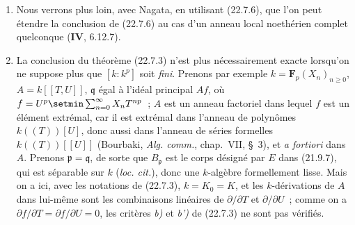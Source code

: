\begin{remarks}[22.7.7]
\label{0.22.7.7-fr}
\begin{enumerate}
  \item[(i)] Nous verrons plus loin, avec Nagata, en utilisant (22.7.6), que
  l'on peut étendre la conclusion de (22.7.6) au cas d'un anneau local
  noethérien complet quelconque (\textbf{IV}, 6.12.7).

  \item[(ii)] La conclusion du théorème (22.7.3) n'est plus nécessairement
  exacte lorsqu'on ne suppose plus que $[k:k^p]$ soit \emph{fini}. Prenons par
  exemple $k=\mathbf F_p(X_n)_{n\geqslant0}$,
  $A=k[[T,U]]$, $\mathfrak q$ égal à l'idéal principal $Af$, où $f=U^p\setmin\sum_{n=0}^{\infty}X_nT^{np}$~;
  $A$ est un anneau factoriel dans lequel $f$ est un élément extrémal, car il
  est extrémal dans l'anneau de polynômes $k((T))[U]$, donc aussi dans
  l'anneau de séries formelles $k((T))[[U]]$ (Bourbaki,
  \emph{Alg. comm.}, chap.~VII, §~3), et \emph{a fortiori} dans $A$.
  Prenons $\mathfrak p=\mathfrak q$, de sorte que $B_{\mathfrak p}$ est le
  corps désigné par $E$ dans (21.9.7), qui est séparable sur $k$
  (\emph{loc. cit.}), donc une $k$-algèbre formellement lisse. Mais on a ici,
  avec les notations de (22.7.3), $k=K_0=K$, et les $k$-dérivations de $A$
  dans lui-même sont les combinaisons linéaires de $\partial/\partial T$ et
  $\partial/\partial U$~; comme on a
  $\partial f/\partial T=\partial f/\partial U=0$, les critères \emph{b)} et \emph{b')} de
  (22.7.3) ne sont pas vérifiés.
\end{enumerate}
\end{remarks}
